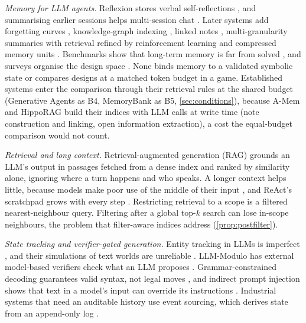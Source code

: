 \documentclass[letterpaper,journal]{IEEEtran}
\begin{document}
\emph{Memory for LLM agents.} Reflexion stores verbal self-reflections \cite{shinn2023reflexion}, and summarising earlier sessions helps multi-session chat \cite{xu2022goldfish}. Later systems add forgetting curves \cite{zhong2024memorybank}, knowledge-graph indexing \cite{gutierrez2024hipporag}, linked notes \cite{xu2025amem}, multi-granularity summaries with retrieval refined by reinforcement learning \cite{tan2025rmm} and compressed memory units \cite{liu2026simplemem}. Benchmarks show that long-term memory is far from solved \cite{maharana2024locomo,wu2025longmemeval}, and surveys organise the design space \cite{sumers2024coala,zhang2025memorysurvey}. None binds memory to a validated symbolic state or compares designs at a matched token budget in a game. Established systems enter the comparison through their retrieval rules at the shared budget (Generative Agents as B4, MemoryBank as B5, \cref{sec:conditions}), because A-Mem and HippoRAG build their indices with LLM calls at write time (note construction and linking, open information extraction), a cost the equal-budget comparison would not count.

\emph{Retrieval and long context.} Retrieval-augmented generation (RAG) grounds an LLM's output in passages fetched from a dense index \cite{lewis2020rag} and ranked by similarity alone, ignoring where a turn happens and who speaks. A longer context helps little, because models make poor use of the middle of their input \cite{liu2024lost}, and ReAct's scratchpad grows with every step \cite{yao2023react}. Restricting retrieval to a scope is a filtered nearest-neighbour query. Filtering after a global top-$k$ search can lose in-scope neighbours, the problem that filter-aware indices address \cite{gollapudi2023filtered} (\cref{prop:postfilter}).

\emph{State tracking and verifier-gated generation.} Entity tracking in LLMs is imperfect \cite{kim2023entity}, and their simulations of text worlds are unreliable \cite{wang2024worldsim}. LLM-Modulo has external model-based verifiers check what an LLM proposes \cite{kambhampati2024llmmodulo}. Grammar-constrained decoding guarantees valid syntax, not legal moves \cite{geng2023gcd}, and indirect prompt injection shows that text in a model's input can override its instructions \cite{greshake2023indirect}. Industrial systems that need an auditable history use event sourcing, which derives state from an append-only log \cite{overeem2021eventsourcing}.
\end{document}
